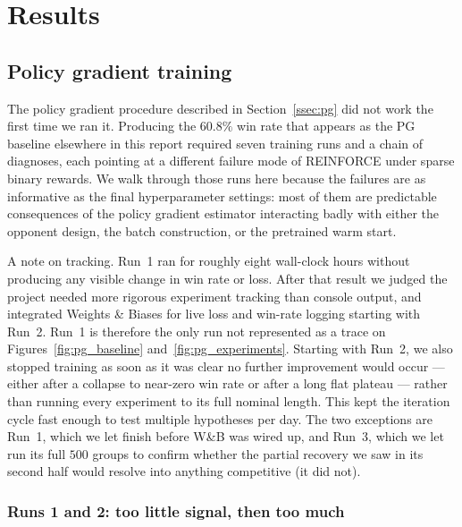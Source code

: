 \documentclass[11pt]{article}
\begin{document}
\section{Results}
\label{sec:results}

\subsection{Policy gradient training}
\label{ssec:pg_results}

The policy gradient procedure described in Section~\ref{ssec:pg} did not
work the first time we ran it. Producing the $60.8\%$ win rate that
appears as the PG baseline elsewhere in this report required seven
training runs and a chain of diagnoses, each pointing at a different
failure mode of REINFORCE under sparse binary rewards. We walk through
those runs here because the failures are as informative as the final
hyperparameter settings: most of them are predictable consequences of
the policy gradient estimator interacting badly with either the
opponent design, the batch construction, or the pretrained warm start.

A note on tracking. Run~1 ran for roughly eight wall-clock hours
without producing any visible change in win rate or loss. After that
result we judged the project needed more rigorous experiment tracking
than console output, and integrated Weights \& Biases for live loss
and win-rate logging starting with Run~2. Run~1 is therefore the only
run not represented as a trace on Figures~\ref{fig:pg_baseline}
and~\ref{fig:pg_experiments}. Starting with Run~2, we also stopped
training as soon as it was clear no further improvement would occur
--- either after a collapse to near-zero win rate or after a long
flat plateau --- rather than running every experiment to its full
nominal length. This kept the iteration cycle fast enough to test
multiple hypotheses per day. The two exceptions are Run~1, which we
let finish before W\&B was wired up, and Run~3, which we let run
its full $500$ groups to confirm whether the partial recovery we saw
in its second half would resolve into anything competitive (it did
not).

\subsubsection{Runs 1 and 2: too little signal, then too much}
\label{sssec:pg_baseline}
\end{document}
